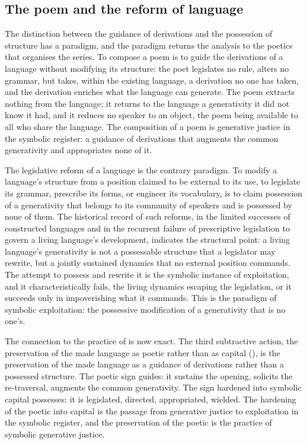 \subsection{The poem and the reform of language}
\label{p10:sec:exp-poem}

The distinction between the guidance of derivations and the possession of structure has a paradigm, and the paradigm returns the analysis to the poetics that organises the series. To compose a poem is to guide the derivations of a language without modifying its structure: the poet legislates no rule, alters no grammar, but takes, within the existing language, a derivation no one has taken, and the derivation enriches what the language can generate. The poem extracts nothing from the language; it returns to the language a generativity it did not know it had, and it reduces no speaker to an object, the poem being available to all who share the language. The composition of a poem is generative justice in the symbolic register: a guidance of derivations that augments the common generativity and appropriates none of it.

The legislative reform of a language is the contrary paradigm. To modify a language's structure from a position claimed to be external to its use, to legislate its grammar, prescribe its forms, or engineer its vocabulary, is to claim possession of a generativity that belongs to its community of speakers and is possessed by none of them. The historical record of such reforms, in the limited successes of constructed languages and in the recurrent failure of prescriptive legislation to govern a living language's development, indicates the structural point: a living language's generativity is not a possessable structure that a legislator may rewrite, but a jointly sustained dynamics that no external position commands. The attempt to possess and rewrite it is the symbolic instance of exploitation, and it characteristically fails, the living dynamics escaping the legislation, or it succeeds only in impoverishing what it commands. This is the paradigm of symbolic exploitation: the possessive modification of a generativity that is no one's.

The connection to the practice of  is now exact. The third subtractive action, the preservation of the made language as poetic rather than as capital (), is the preservation of the made language as a guidance of derivations rather than a possessed structure. The poetic sign guides: it sustains the opening, solicits the re-traversal, augments the common generativity. The sign hardened into symbolic capital possesses: it is legislated, directed, appropriated, wielded. The hardening of the poetic into capital is the passage from generative justice to exploitation in the symbolic register, and the preservation of the poetic is the practice of symbolic generative justice.

